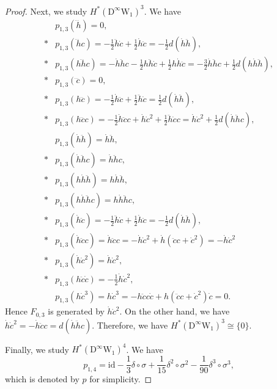 \documentclass[12pt]{amsart}
\newcommand{\W}{\mathrm{W}}
\newcommand{\D}{\mathrm{D}}
\newcommand{\id}{{\mathrm{id}}}
\theoremstyle{definition}
\theoremstyle{remark}
\begin{document}
\begin{proof}
Next, we study $H^*(\D^\infty\W_1)^3$.
We have
\begin{align*}
&p_{1,3}(\dddot{h})=0,\\*
&p_{1,3}(\dddot{h}c)=-\frac12\ddot{h}\dot{c}+\frac12\dot{h}\ddot{c}=-\frac12d(\dot{h}\ddot{h}),\\*
&p_{1,3}(h\dddot{h}c)=-\dot{h}\ddot{h}c-\frac12h\ddot{h}\dot{c}+\frac12h\dot{h}\ddot{c}=-\frac32\dot{h}\ddot{h}c+\frac12d(h\dot{h}\ddot{h}),\\*
&p_{1,3}(\dddot{c})=0,\\*
&p_{1,3}(h\dddot{c})=-\frac12\dot{h}\ddot{c}+\frac12\ddot{h}\dot{c}=\frac12d(\dot{h}\ddot{h}),\\*
&p_{1,3}(h\dddot{c}c)=-\frac12\dot{h}\ddot{c}c+\dot{h}\dot{c}^2+\frac12\ddot{h}\dot{c}c=\dot{h}\dot{c}^2+\frac12d(\dot{h}\ddot{h}c),\\
&p_{1,3}(\dot{h}\ddot{h})=\dot{h}\ddot{h},\\*
&p_{1,3}(\dot{h}\ddot{h}c)=\dot{h}\ddot{h}c,\\*
&p_{1,3}(h\dot{h}\ddot{h})=h\dot{h}\ddot{h},\\*
&p_{1,3}(h\dot{h}\ddot{h}c)=h\dot{h}\ddot{h}c,\\*
&p_{1,3}(\dot{h}\ddot{c})=-\frac12\ddot{h}\dot{c}+\frac12\dot{h}\ddot{c}=-\frac12d(\dot{h}\ddot{h}),\\*
&p_{1,3}(\dot{h}\ddot{c}c)=\dot{h}\ddot{c}c=-\dot{h}\dot{c}^2+\dot{h}(\ddot{c}c+\dot{c}^2)=-\dot{h}\dot{c}^2\\*
&p_{1,3}(\dot{h}\dot{c}^2)=\dot{h}\dot{c}^2,\\*
&p_{1,3}(h\ddot{c}\dot{c})=-\frac12\dot{h}\dot{c}^2,\\
&p_{1,3}(h\dot{c}^3)=h\dot{c}^3=-h\ddot{c}c\dot{c}+h(\ddot{c}c+\dot{c}^2)\dot{c}=0.
\end{align*}
Hence $F_{0,3}$ is generated by $\dot{h}\dot{c}^2$.
On the other hand, we have $\dot{h}\dot{c}^2=-\dot{h}\ddot{c}c=d(\dot{h}\ddot{h}c)$.
Therefore, we have $H^*(\D^\infty\W_1)^3\cong\{0\}$.

Finally, we study $H^*(\D^\infty\W_1)^4$.
We have
\[
p_{1,4}=\id-\frac13\delta\circ\sigma+\frac1{15}\delta^2\circ\sigma^2-\frac1{90}\delta^3\circ\sigma^3,
\]
which is denoted by $p$ for simplicity.


\end{proof}
\end{document}

